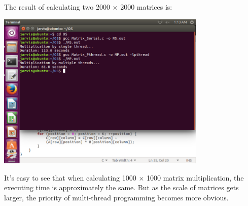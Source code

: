 \documentclass[a4paper, 11pt]{article}
\begin{document}
The result of calculating two 2000 $\times$ 2000 matrices is:

\includegraphics[width=10cm]{pic/2000.png}

It's easy to see that when calculating 1000 $\times$ 1000 matrix multiplication, the executing time is approximately the same. But as the scale of matrices gets larger, the priority of multi-thread programming becomes more obvious. 
\end{document}
